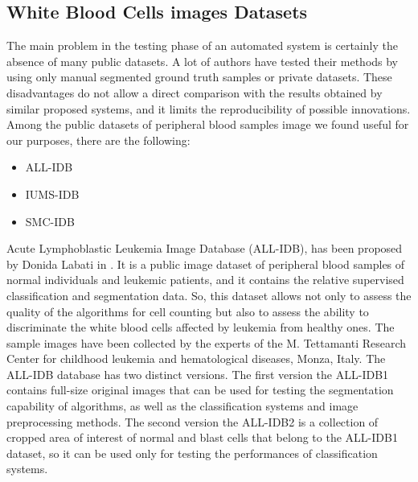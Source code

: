 \subsection{White Blood Cells images Datasets}
\label{wbc_datasets}
The main problem in the testing phase of an automated system is certainly the absence of many public datasets. A lot of authors have tested their methods by using only manual segmented ground truth samples or private datasets. These disadvantages do not allow a direct comparison with the results obtained by similar proposed systems, and it limits the reproducibility of possible innovations. Among the public datasets of peripheral blood samples image we found useful for our purposes, there are the following:
\begin{itemize}
	\item ALL-IDB \cite{Donida}
	\item IUMS-IDB \cite{Sarrafzadeh}
	\item SMC-IDB \cite{Mohamed}
\end{itemize} 
Acute Lymphoblastic Leukemia Image Database (\acs{ALL-IDB}), has been proposed by Donida Labati in \cite{Donida}. It is a public image dataset of peripheral blood samples of normal individuals and leukemic patients, and it contains the relative supervised classification and segmentation data. So, this dataset allows not only to assess the quality of the algorithms for cell counting but also to assess the ability to discriminate the white blood cells affected by leukemia from healthy ones. The sample images have been collected by the experts of the M. Tettamanti Research Center for childhood leukemia and hematological diseases, Monza, Italy. The ALL-IDB database has two distinct versions. The first version the ALL-IDB1 contains full-size original images that can be used for testing the segmentation capability of algorithms, as well as the classification systems and image preprocessing methods. The second version the ALL-IDB2 is a collection of cropped area of interest of normal and blast cells that belong to the ALL-IDB1 dataset, so it can be used only for testing the performances of classification systems.

